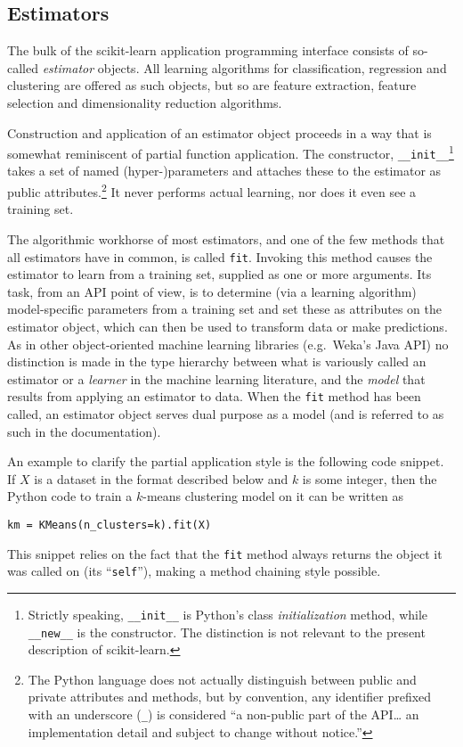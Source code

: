\documentclass{llncs}
\begin{document}
\subsection{Estimators}


The bulk of the scikit-learn application programming interface
consists of so-called \textit{estimator} objects.
All learning algorithms for classification, regression and clustering
are offered as such objects,
but so are feature extraction, feature selection and dimensionality reduction
algorithms.

Construction and application of an estimator object
proceeds in a way that is somewhat reminiscent of partial function application.
The constructor, \texttt{\_\_init\_\_}\footnote{
  Strictly speaking, \texttt{\_\_init\_\_} is Python's
  class \textit{initialization} method,
  while \texttt{\_\_new\_\_} is the constructor.
  The distinction is not relevant to the present description of scikit-learn.}
takes a set of named (hyper-)parameters
and attaches these to the estimator as public attributes.\footnote{
  The Python language does not actually distinguish between public and private
  attributes and methods,
  but by convention, any identifier prefixed with an underscore (\texttt{\_})
  is considered ``a non-public part of the API\ldots
  an implementation detail and subject to change without notice.''
  }
It never performs actual learning, nor does it even see a training set.

The algorithmic workhorse of most estimators, and one of the few methods
that all estimators have in common, is called \texttt{fit}.
Invoking this method causes the estimator to learn from a training set,
supplied as one or more arguments.
Its task, from an API point of view,
is to determine (via a learning algorithm) model-specific parameters
from a training set and set these as attributes on the estimator object,
which can then be used to transform data or make predictions.
As in other object-oriented machine learning libraries
(e.g.\ Weka's Java API)
no distinction is made in the type hierarchy
between what is variously called an estimator or a \textit{learner}
in the machine learning literature,
and the \textit{model} that results from applying an estimator to data.
When the \texttt{fit} method has been called,
an estimator object serves dual purpose as a model
(and is referred to as such in the documentation).

An example to clarify the partial application style
is the following code snippet.
If $X$ is a dataset in the format described below and $k$ is some integer,
then the Python code to train a $k$-means clustering model on it
can be written as
\begin{verbatim}
km = KMeans(n_clusters=k).fit(X)
\end{verbatim}
This snippet relies on the fact that the \texttt{fit} method
always returns the object it was called on (its ``\texttt{self}''),
making a method chaining style possible.
\end{document}
